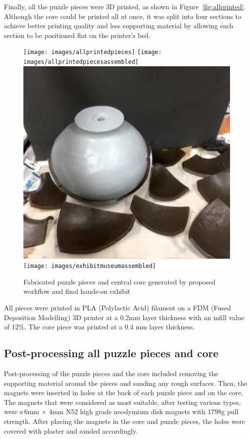 \documentclass[acmlarge,screen,dvipsnames]{acmart}
\begin{document}
Finally, all the puzzle pieces were 3D printed, as shown in
Figure~\ref{fig:allprinted}. Although the core could be printed all at
once, it was split into four sections to achieve better printing
quality and less supporting material by allowing each section to be
positioned flat on the printer's bed.

\begin{figure}[htb]
  \centering
  {\texttt{[image: images/allprintedpieces]}}
  {\texttt{[image: images/allprintedpiecesassembled]}}\\
   {\includegraphics[width=0.4299\linewidth]{images/painting}}
  {\texttt{[image: images/exhibitmuseumassembled]}}
    \caption{Fabricated puzzle pieces and central core generated by proposed workflow and final hands-on exhibit}
\end{figure}

All pieces were printed in PLA (Polylactic Acid) filament on a FDM
(Fused Deposition Modelling) 3D printer at a 0.2mm layer thickness
with an infill value of 12\%. The core piece was printed at a 0.4 mm
layer thickness.


\subsection{Post-processing all puzzle pieces and core}

Post-processing of the puzzle pieces and the core included removing
the supporting material around the pieces and sanding any rough
surfaces. Then, the magnets were inserted in holes at the back of each
puzzle piece and on the core. The magnets that were considered as most
suitable, after testing various types, were \o\,6mm$\,\times\,$4mm N52
high grade neodymium disk magnets with 1798g pull strength. After
placing the magnets in the core and puzzle pieces, the holes were
covered with plaster and sanded accordingly.
\end{document}
